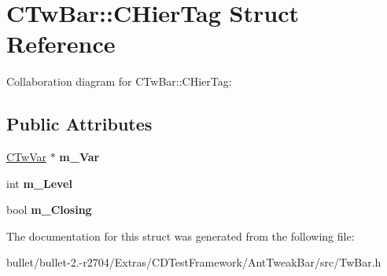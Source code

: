 \hypertarget{struct_c_tw_bar_1_1_c_hier_tag}{\section{C\+Tw\+Bar\+:\+:C\+Hier\+Tag Struct Reference}
\label{struct_c_tw_bar_1_1_c_hier_tag}
}


Collaboration diagram for C\+Tw\+Bar\+:\+:C\+Hier\+Tag\+:
\subsection*{Public Attributes}
\begin{DoxyCompactItemize}
\item 
\hypertarget{struct_c_tw_bar_1_1_c_hier_tag_a62be1d2290ac4994f2cbb1064520721e}{\hyperlink{struct_c_tw_var}{C\+Tw\+Var} $\ast$ {\bfseries m\+\_\+\+Var}}\label{struct_c_tw_bar_1_1_c_hier_tag_a62be1d2290ac4994f2cbb1064520721e}

\item 
\hypertarget{struct_c_tw_bar_1_1_c_hier_tag_a7056665711693f36db75d0914c031427}{int {\bfseries m\+\_\+\+Level}}\label{struct_c_tw_bar_1_1_c_hier_tag_a7056665711693f36db75d0914c031427}

\item 
\hypertarget{struct_c_tw_bar_1_1_c_hier_tag_a776ded33a8f9edbe74f78a6b389b230b}{bool {\bfseries m\+\_\+\+Closing}}\label{struct_c_tw_bar_1_1_c_hier_tag_a776ded33a8f9edbe74f78a6b389b230b}

\end{DoxyCompactItemize}


The documentation for this struct was generated from the following file\+:\begin{DoxyCompactItemize}
\item 
bullet/bullet-\/2.-\/r2704/\+Extras/\+C\+D\+Test\+Framework/\+Ant\+Tweak\+Bar/src/Tw\+Bar.\+h\end{DoxyCompactItemize}
